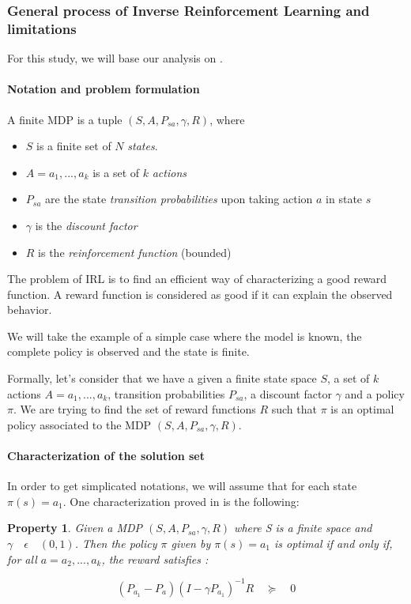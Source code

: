 \documentclass{article}
\newtheorem{property}{Property}
\begin{document}
\subsubsection{General process of Inverse Reinforcement Learning and limitations}

For this study, we will base our analysis on \cite{Ng00}.

\paragraph{Notation and problem formulation}

A finite MDP is a tuple $(S,A,P_{sa},\gamma,R)$, where
\begin{itemize}
    \item $S$ is a finite set of $N$ \emph{states}.
    \item $A={a_{1},...,a_{k}}$ is a set of $k$ \emph{actions} 
    \item $P_{sa}$ are the state \emph{transition probabilities} upon taking action $a$ in state $s$
    \item $\gamma$ is the \emph{discount factor}
    \item $R$ is the \emph{reinforcement function} (bounded) 
\end{itemize}

The problem of IRL is to find an efficient way of characterizing a good reward function. A reward function is considered as good if it can explain the observed behavior.

We will take the example of a simple case where the model is known, the complete policy is observed and the state is finite. 

Formally, let's consider that we have a given a finite state space $S$, a set of $k$ actions $A={a_{1},...,a_{k}}$, transition probabilities $P_{sa}$, a discount factor $\gamma$ and a policy $\pi$. We are trying to find the set of reward functions $R$ such that $\pi$ is an optimal policy associated to the MDP  $(S,A,P_{sa},\gamma,R)$.

\paragraph{Characterization of the solution set}

In order to get simplicated notations, we will assume that for each state $\pi( s) = a_{1} $. 
One characterization proved in \cite{Ng00} is the following:

\begin{property}
Given a MDP  $(S,A,P_{sa},\gamma,R)$ where S is a finite space and $\gamma \quad \epsilon \quad (0,1)$. Then the policy $\pi$ given by $ \pi(s)=a_{1}$ is optimal if and only if, for all $a=a_{2},...,a_{k}$, the reward satisfies :

\[
({ P }_{ a_{ 1 } }-{ P }_{ a }){ (I-\gamma { P }_{ { a }_{ 1 } }) }^{ -1 }R\quad \succeq \quad 0
\]
\end{property}
\end{document}
